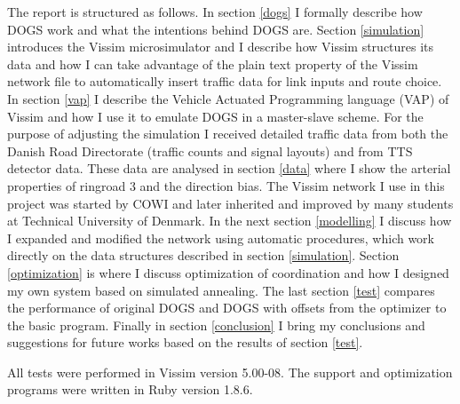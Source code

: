 The report is structured as follows. In section \ref{dogs} I formally describe how DOGS work and what the intentions behind DOGS are. Section \ref{simulation} introduces the Vissim microsimulator and I describe how Vissim structures its data and how I can take advantage of the plain text property of the Vissim network file to automatically insert traffic data for link inputs and route choice. In section \ref{vap} I describe the Vehicle Actuated Programming language (VAP) of Vissim and how I use it to emulate DOGS in a master-slave scheme. For the purpose of adjusting the simulation I received detailed traffic data from both the Danish Road Directorate (traffic counts and signal layouts) and from TTS detector data. These data are analysed in section \ref{data} where I show the arterial properties of ringroad 3 and the direction bias. The Vissim network I use in this project was started by COWI and later inherited and improved by many students at Technical University of Denmark. In the next section \ref{modelling} I discuss how I expanded and modified the network using automatic procedures, which work directly on the data structures described in section \ref{simulation}. Section \ref{optimization} is where I discuss optimization of coordination and how I designed my own system based on simulated annealing. The last section \ref{test} compares the performance of original DOGS and DOGS with offsets from the optimizer to the basic program. Finally in section \ref{conclusion} I bring my conclusions and suggestions for future works based on the results of section \ref{test}.

All tests were performed in Vissim version 5.00-08. The support and optimization programs were written in Ruby version 1.8.6.